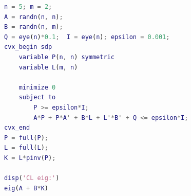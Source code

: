\begin{lstlisting}[language=Matlab]
n = 5; m = 2;
A = randn(n, n);
B = randn(n, m);
Q = eye(n)*0.1;  I = eye(n); epsilon = 0.001;
cvx_begin sdp
    variable P(n, n) symmetric
    variable L(m, n)
    
    minimize 0
    subject to
    	P >= epsilon*I;
        A*P + P*A' + B*L + L'*B' + Q <= epsilon*I;
cvx_end
P = full(P);
L = full(L);
K = L*pinv(P);

disp('CL eig:')
eig(A + B*K)
\end{lstlisting}